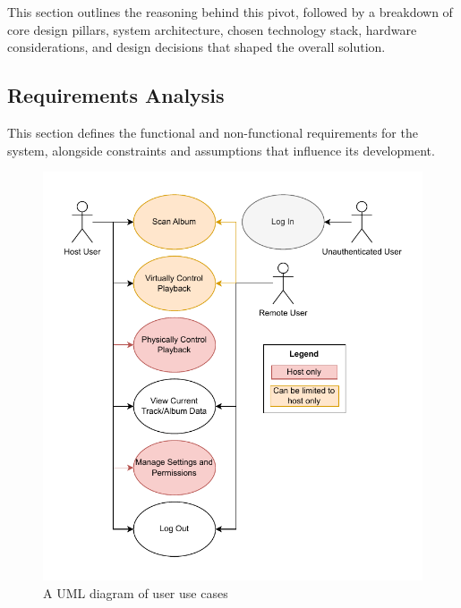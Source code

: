         This section outlines the reasoning behind this pivot, followed by a breakdown of core design pillars, system architecture, chosen technology stack, hardware considerations, and design decisions that shaped the overall solution.
        
        \subsection{Requirements Analysis} \label{sec:reqany}
    
            This section defines the functional and non-functional requirements for the system, alongside constraints and assumptions that influence its development.
    
            \begin{figure}
                \centering
                \includegraphics[width=0.65\linewidth]{images/UML_UseCase.pdf}
                \caption{A UML diagram of user use cases}
                \label{fig:umlusecase}
            \end{figure}
    
